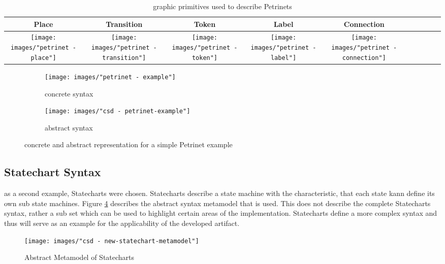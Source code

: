 \begin{table}[ht]
  \centering
\begin{tabular}[width=.1\linewidth]{| Sc | Sc | Sc | Sc | Sc |}
  \hline
  Place & Transition & Token & Label & Connection 
  \\
  \hline
  \texttt{[image: images/"petrinet - place"]} 
  & 
  \texttt{[image: images/"petrinet - transition"]} 
  & 
  \texttt{[image: images/"petrinet - token"]}
  & 
  \texttt{[image: images/"petrinet - label"]}
  & 
  \texttt{[image: images/"petrinet - connection"]} 
  \\
  \hline
\end{tabular}
\caption{graphic primitives used to describe Petrinets}
\label{tab:petri-primitives}
\end{table}

\begin{figure}[ht!]
  \centering
  \begin{subfigure}[t]{.4\textwidth}
    \centering
    \texttt{[image: images/"petrinet - example"]}
    \caption{concrete syntax}
    \label{subfig:petriconcrete}    
  \end{subfigure}
  \begin{subfigure}[t]{.45\textwidth}
    \centering
    \texttt{[image: images/"csd - petrinet-example"]}
    \caption{abstract syntax}
    \label{subfig:petriabstract}    
  \end{subfigure}
  \caption{concrete and abstract representation for a simple Petrinet example}
  \label{fig:petrinets_example}
\end{figure} 

\subsection{Statechart Syntax}
\label{sec:statecharts}
as a second example, Statecharts were chosen. Statecharts describe a state machine with the characteristic, that each state kann define its own sub state machines. Figure \ref{fig:statechartmm} describes the abstract syntax metamodel that is used. This does not describe the complete Statecharts syntax, rather a sub set which can be used to highlight certain areas of the implementation. Statecharts define a more complex syntax and thus will serve as an example for the applicability of the developed artifact.

\begin{figure}
\centering
\texttt{[image: images/"csd - new-statechart-metamodel"]}
\caption{Abstract Metamodel of Statecharts}
\label{fig:statechartmm}
\end{figure}

